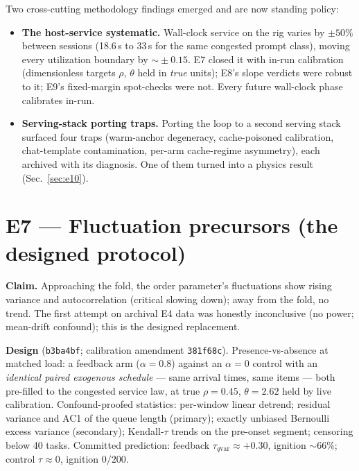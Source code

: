 \documentclass[11pt]{article}
\newcommand{\commit}[1]{\texttt{\small #1}}
\begin{document}
Two cross-cutting methodology findings emerged and are now standing
policy:
\begin{itemize}
  \item \textbf{The host-service systematic.} Wall-clock service on the
  rig varies by $\pm 50\%$ between sessions (18.6\,s to 33\,s for the
  same congested prompt class), moving every utilization boundary by
  $\sim\!\pm 0.15$. E7 closed it with in-run calibration (dimensionless
  targets $\rho$, $\theta$ held in \emph{true} units); E8's slope
  verdicts were robust to it; E9's fixed-margin spot-checks were not.
  Every future wall-clock phase calibrates in-run.
  \item \textbf{Serving-stack porting traps.} Porting the loop to a
  second serving stack surfaced four traps (warm-anchor degeneracy,
  cache-poisoned calibration, chat-template contamination, per-arm
  cache-regime asymmetry), each archived with its diagnosis. One of
  them turned into a physics result (Sec.~\ref{sec:e10}).
\end{itemize}

\section{E7 --- Fluctuation precursors (the designed protocol)}
\textbf{Claim.} Approaching the fold, the order parameter's
fluctuations show rising variance and autocorrelation (critical slowing
down); away from the fold, no trend. The first attempt on archival E4
data was honestly inconclusive (no power; mean-drift confound); this is
the designed replacement.

\textbf{Design} (\commit{b3ba4bf}; calibration amendment
\commit{381f68c}). Presence-vs-absence at matched load: a feedback arm
($\alpha{=}0.8$) against an $\alpha{=}0$ control with an \emph{identical
paired exogenous schedule} --- same arrival times, same items --- both
pre-filled to the congested service law, at true $\rho=0.45$,
$\theta=2.62$ held by live calibration. Confound-proofed statistics:
per-window linear detrend; residual variance and AC1 of the queue
length (primary); exactly unbiased Bernoulli excess variance
(secondary); Kendall-$\tau$ trends on the pre-onset segment; censoring
below 40 tasks. Committed prediction: feedback $\tau_{q\mathrm{var}}
\approx +0.30$, ignition $\sim\!66\%$; control $\tau \approx 0$,
ignition $0/200$.
\end{document}
